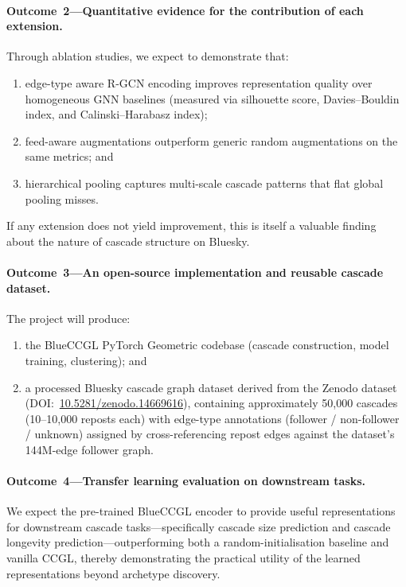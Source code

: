 \documentclass[12pt,a4paper]{article}
\begin{document}
\paragraph{Outcome~2---Quantitative evidence for the contribution of each
extension.}
Through ablation studies, we expect to demonstrate that:
\begin{enumerate}[label=(\alph*)]
  \item edge-type aware R-GCN encoding improves representation quality over
        homogeneous GNN baselines (measured via silhouette score,
        Davies--Bouldin index, and Calinski--Harabasz index);
  \item feed-aware augmentations outperform generic random augmentations on
        the same metrics; and
  \item hierarchical pooling captures multi-scale cascade patterns that flat
        global pooling misses.
\end{enumerate}
If any extension does not yield improvement, this is itself a valuable
finding about the nature of cascade structure on Bluesky.

\paragraph{Outcome~3---An open-source implementation and reusable cascade
dataset.}
The project will produce:
\begin{enumerate}[label=(\alph*)]
  \item the BlueCCGL PyTorch Geometric codebase (cascade construction, model
        training, clustering); and
  \item a processed Bluesky cascade graph dataset derived from the
        \citet{failla2024bluesky} Zenodo dataset
        (DOI:~\href{https://doi.org/10.5281/zenodo.14669616}{10.5281/zenodo.14669616}),
        containing approximately 50,000 cascades (10--10,000 reposts each)
        with edge-type annotations (follower / non-follower / unknown)
        assigned by cross-referencing repost edges against the dataset's
        144M-edge follower graph.
\end{enumerate}

\paragraph{Outcome~4---Transfer learning evaluation on downstream tasks.}
We expect the pre-trained BlueCCGL encoder to provide useful representations
for downstream cascade tasks---specifically cascade size prediction and
cascade longevity prediction---outperforming both a random-initialisation
baseline and vanilla CCGL, thereby demonstrating the practical utility of the
learned representations beyond archetype discovery.
\end{document}
